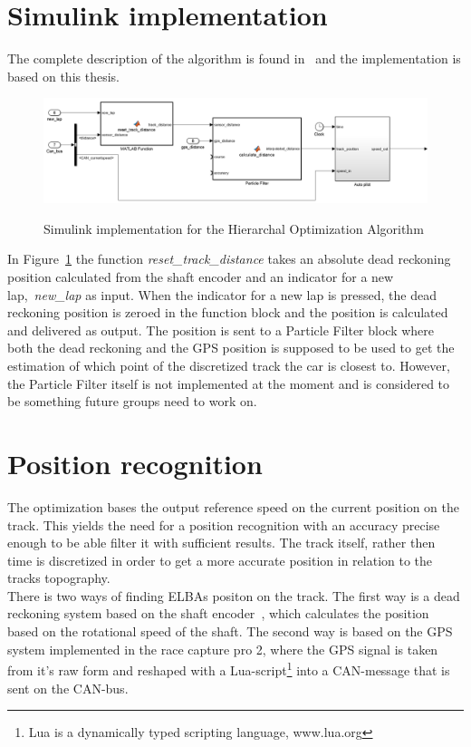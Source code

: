 \section{Simulink implementation}
The complete description of the algorithm is found in~\cite{liu2016} and the
implementation is based on this thesis.
\begin{figure}[H]
    \centering\label{fig:optimization_cont}
    \includegraphics[width=\textwidth]{./img/optimization_cont.png}
    \caption{Simulink implementation for the Hierarchal Optimization Algorithm}
\end{figure}
In Figure~\ref{fig:optimization_cont} the function
\textit{reset\_track\_distance} takes an absolute dead reckoning position
calculated from the shaft encoder and an indicator for a new
lap,~\textit{new\_lap} as input. When the indicator for a new lap is pressed,
the dead reckoning position is zeroed in the function block and the position is
calculated and delivered as output. The position is sent to a Particle Filter
block where both the dead reckoning and the GPS position is supposed to be used
to get the estimation of which point of the discretized track the car is closest
to. However, the Particle Filter itself is not implemented at the moment and is
considered to be something future groups need to work on. 

\section{Position recognition}
The optimization bases the output reference speed on the current position on the
track. This yields the need for a position recognition with an accuracy precise
enough to be able filter it with sufficient results. The track itself, rather
then time is discretized in order to get a more accurate position in relation to
the tracks topography. \\
There is two ways of finding ELBAs positon on the track. The first way is a dead
reckoning system based on the shaft encoder~\cite[p.~49]{elba2015},
which calculates the position based on the rotational speed of the shaft. The
second way is based on the GPS system implemented in the race capture pro 2,
where the GPS signal is taken from it's raw form and reshaped with a
Lua-script\footnote{Lua is a dynamically typed scripting language, www.lua.org}
into a CAN-message that is sent on the CAN-bus.
